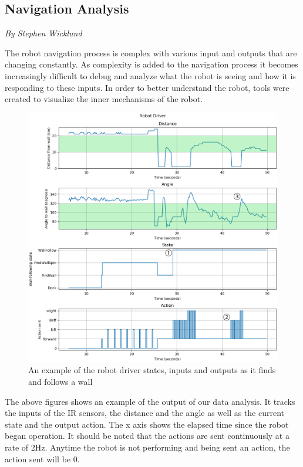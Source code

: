 \documentclass[12pt]{report}
\newcommand{\sectionAuthor}[1]{{\small\vspace{-1em}\textit{#1}}\bigskip\par}
\begin{document}
\subsection{Navigation Analysis}
\sectionAuthor{By Stephen Wicklund}
The robot navigation process is complex with various input and outputs that are changing constantly. As complexity is added to the navigation process it becomes increasingly difficult to debug and analyze what the robot is seeing and how it is responding to these inputs. In order to better understand the robot, tools were created to visualize the inner mechanisms of the robot.

\begin{figure}[H]
    \centering
    \includegraphics[scale=0.6]{images/driverPlotAnnotated.png}
    \caption{An example of the robot driver states, inputs and outputs as it finds and follows a wall}
    \label{Robot Driver Plot}
\end{figure}

The above figures shows an example of the output of our data analysis. It tracks the inputs of the IR sensors, the distance and the angle as well as the current state and the output action. The x axis shows the elapsed time since the robot began operation. It should be noted that the actions are sent continuously at a rate of 2Hz. Anytime the robot is not performing and being sent an action, the action sent will be 0.
\end{document}
